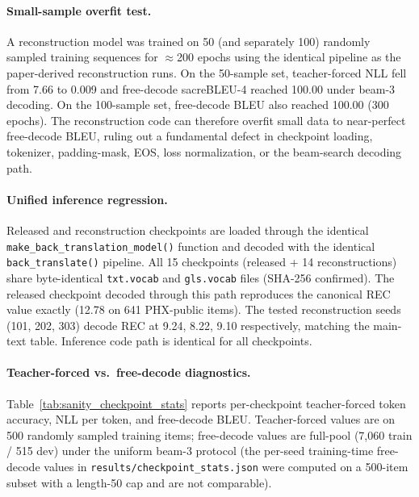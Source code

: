 \documentclass[pdflatex,sn-chicago]{sn-jnl}
\begin{document}
\paragraph{Small-sample overfit test.}
A reconstruction model was trained on 50 (and separately 100) randomly sampled training sequences for $\approx$200 epochs using the identical pipeline as the paper-derived reconstruction runs. On the 50-sample set, teacher-forced NLL fell from 7.66 to 0.009 and free-decode sacreBLEU-4 reached 100.00 under beam-3 decoding. On the 100-sample set, free-decode BLEU also reached 100.00 (300 epochs). The reconstruction code can therefore overfit small data to near-perfect free-decode BLEU, ruling out a fundamental defect in checkpoint loading, tokenizer, padding-mask, EOS, loss normalization, or the beam-search decoding path.

\paragraph{Unified inference regression.}
Released and reconstruction checkpoints are loaded through the identical \texttt{make\_back\_translation\_model()} function and decoded with the identical \texttt{back\_translate()} pipeline. All 15 checkpoints (released + 14 reconstructions) share byte-identical \texttt{txt.vocab} and \texttt{gls.vocab} files (SHA-256 confirmed). The released checkpoint decoded through this path reproduces the canonical REC value exactly (12.78 on 641 PHX-public items). The tested reconstruction seeds (101, 202, 303) decode REC at 9.24, 8.22, 9.10 respectively, matching the main-text table. Inference code path is identical for all checkpoints.

\paragraph{Teacher-forced vs.\ free-decode diagnostics.}
Table~\ref{tab:sanity_checkpoint_stats} reports per-checkpoint teacher-forced token accuracy, NLL per token, and free-decode BLEU. Teacher-forced values are on 500 randomly sampled training items; free-decode values are full-pool (7{,}060 train / 515 dev) under the uniform beam-3 protocol (the per-seed training-time free-decode values in \texttt{results/checkpoint\_stats.json} were computed on a 500-item subset with a length-50 cap and are not comparable).
\end{document}
